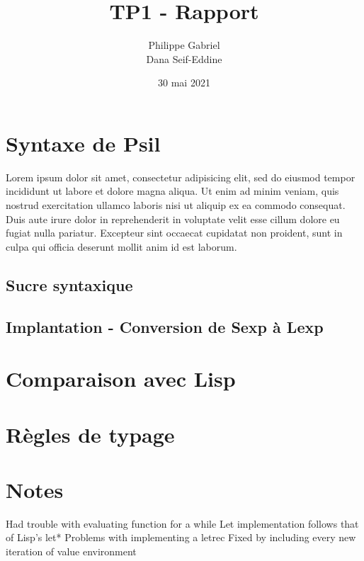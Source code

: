 \documentclass[12pt, titlepage]{article}
\title{{\Huge \textbf{TP1 - Rapport}}}
\author{Philippe Gabriel \\ Dana Seif-Eddine}
\date{30 mai 2021}
\begin{document}
\maketitle

\section{Syntaxe de Psil}

Lorem ipsum dolor sit amet, consectetur adipisicing elit, sed do eiusmod tempor incididunt ut labore et dolore magna aliqua. Ut enim ad minim veniam, quis nostrud exercitation ullamco laboris nisi ut aliquip ex ea commodo consequat. Duis aute irure dolor in reprehenderit in voluptate velit esse cillum dolore eu fugiat nulla pariatur. Excepteur sint occaecat cupidatat non proident, sunt in culpa qui officia deserunt mollit anim id est laborum.

\subsection{Sucre syntaxique}

\subsection{Implantation - Conversion de Sexp à Lexp}

\section{Comparaison avec Lisp}

\section{Règles de typage}

\section{Notes}

Had trouble with evaluating function for a while
Let implementation follows that of Lisp's let*
Problems with implementing a letrec
Fixed by including every new iteration of value environment
\end{document}
